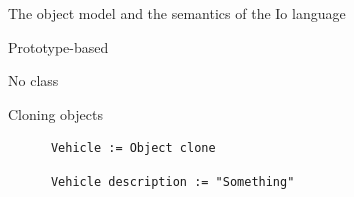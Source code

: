 \begin{frame}
  \begin{center}
    The object model and the semantics of the Io language
  \end{center}
\end{frame}

\begin{frame}
  \begin{center}
    Prototype-based
  \end{center}
\end{frame}

\begin{frame}
  \begin{center}
    No class
  \end{center}
\end{frame}

\begin{frame}
  \begin{center}
    Cloning objects
  \end{center}
\end{frame}

\begin{frame}[fragile]
  \begin{center}
    \begin{lstlisting}
      Vehicle := Object clone
    \end{lstlisting}
  \end{center}
\end{frame}

\begin{frame}[fragile]
  \begin{center}
    \begin{lstlisting}
      Vehicle description := "Something"
    \end{lstlisting}
  \end{center}
\end{frame}

